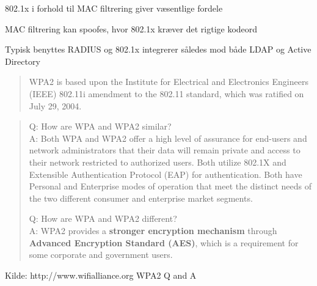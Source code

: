 \documentclass[Screen16to9,17pt]{foils}
\begin{document}

\begin{list1}
\item 802.1x i forhold til MAC filtrering giver væsentlige fordele
\item MAC filtrering kan spoofes, hvor 802.1x kræver det rigtige kodeord
\item Typisk benyttes RADIUS og 802.1x integrerer således mod både LDAP og Active Directory
\end{list1}





\begin{quote}
WPA2 is based upon the Institute for Electrical and Electronics
Engineers (IEEE) 802.11i amendment to the 802.11 standard, which was
ratified on July 29, 2004.
\end{quote}

\begin{quote}
Q: How are WPA and WPA2 similar?\\
A: Both WPA and WPA2 offer a high level of assurance for end-users and network
administrators that their data will remain private and access to their
network restricted to authorized users.
Both utilize 802.1X and Extensible Authentication Protocol (EAP) for
authentication. Both have Personal and Enterprise modes of operation
that meet the distinct needs of the two different consumer and
enterprise market segments.

Q: How are WPA and WPA2 different?\\
A: WPA2 provides a {\bf stronger encryption mechanism} through {\bf
  Advanced Encryption Standard (AES)}, which is a requirement for some
corporate and government users.
\end{quote}

\centerline{Kilde: http://www.wifialliance.org WPA2 Q and A}


\end{document}
